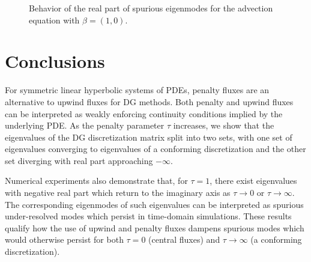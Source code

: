 \documentclass[preprint,10pt]{elsarticle}
\begin{document}
\begin{figure}
\centering
{}
\hspace{.5em}
\hspace{.5em}
\caption{Behavior of the real part of spurious eigenmodes for the advection equation with $\beta = (1,0)$. }
\label{fig:trackModesAdvecU}
\end{figure}

\section{Conclusions}

For symmetric linear hyperbolic systems of PDEs, penalty fluxes are an alternative to upwind fluxes for DG methods.  Both penalty and upwind fluxes can be interpreted as weakly enforcing continuity conditions implied by the underlying PDE.  As the penalty parameter $\tau$ increases, we show that the eigenvalues of the DG discretization matrix split into two sets, with one set of eigenvalues converging to eigenvalues of a conforming discretization and the other set diverging with real part approaching $-\infty$.  

Numerical experiments also demonstrate that, for $\tau = 1$, there exist eigenvalues with negative real part which return to the imaginary axis as $\tau \rightarrow 0$ or $\tau\rightarrow \infty$.  The corresponding eigenmodes of such eigenvalues can be interpreted as spurious under-resolved modes which persist in time-domain simulations.  These results qualify how the use of upwind and penalty fluxes dampens spurious modes which would otherwise persist for both $\tau = 0$ (central fluxes) and $\tau \rightarrow\infty$ (a conforming discretization).  



\end{document}

